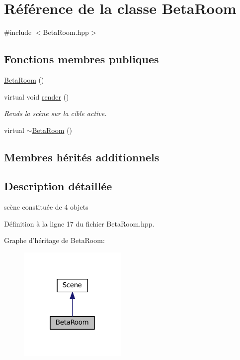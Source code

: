 \hypertarget{classBetaRoom}{\section{Référence de la classe Beta\+Room}
\label{classBetaRoom}
}


{\ttfamily \#include $<$Beta\+Room.\+hpp$>$}

\subsection*{Fonctions membres publiques}
\begin{DoxyCompactItemize}
\item 
\hyperlink{classBetaRoom_a2dbe2bd7a60336a10040604baca9f389}{Beta\+Room} ()
\item 
virtual void \hyperlink{classBetaRoom_a5ca4002697c35ee24a59d9d2ccab3e49}{render} ()
\begin{DoxyCompactList}\small\item\em Rends la scène sur la cible active. \end{DoxyCompactList}\item 
virtual \hyperlink{classBetaRoom_a03ddec958e0cfb3e9458ea68b9b5a6b7}{$\sim$\+Beta\+Room} ()
\end{DoxyCompactItemize}
\subsection*{Membres hérités additionnels}


\subsection{Description détaillée}
scène constituée de 4 objets 

Définition à la ligne 17 du fichier Beta\+Room.\+hpp.



Graphe d'héritage de Beta\+Room\+:
\nopagebreak
\begin{figure}[H]
\begin{center}
\leavevmode
\includegraphics[width=147pt]{classBetaRoom__inherit__graph}
\end{center}
\end{figure}


